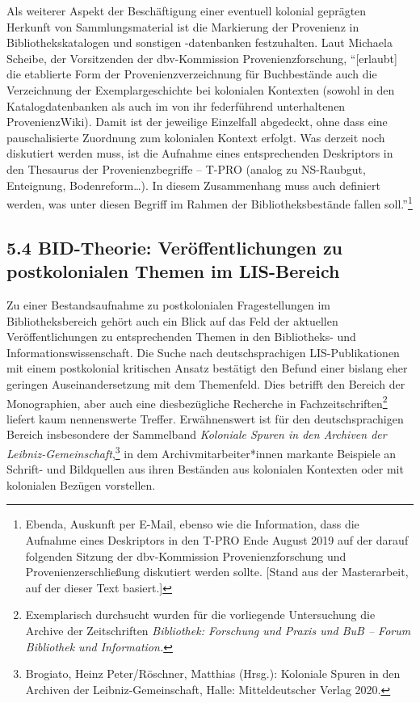 \documentclass[a4paper,
fontsize=11pt,
oneside,
numbers=noperiodatend,
parskip=half-,
bibliography=totoc,
final
]{scrartcl}
\begin{document}
Als weiterer Aspekt der Beschäftigung einer eventuell kolonial geprägten
Herkunft von Sammlungsmaterial ist die Markierung der Provenienz in
Bibliothekskatalogen und sonstigen -daten\-banken festzuhalten. Laut
Michaela Scheibe, der Vorsitzenden der dbv-Kommission
Provenienzforschung, \enquote{{[}erlaubt{]} die etablierte Form der
Provenienzverzeichnung für Buchbestände auch die Verzeichnung der
Exemplargeschichte bei kolonialen Kontexten (sowohl in den
Katalogdatenbanken als auch im von ihr federführend unterhaltenen
ProvenienzWiki). Damit ist der jeweilige Einzelfall abgedeckt, ohne dass
eine pauschalisierte Zuordnung zum kolonialen Kontext erfolgt. Was
derzeit noch diskutiert werden muss, ist die Aufnahme eines
entsprechenden Deskriptors in den Thesaurus der Provenienzbegriffe --
T-PRO (analog zu NS-Raubgut, Enteignung, Bodenreform\ldots). In diesem
Zusammenhang muss auch definiert werden, was unter diesen Begriff im
Rahmen der Bibliotheksbestände fallen soll.}\footnote{Ebenda, Auskunft
  per E-Mail, ebenso wie die Information, dass die Aufnahme eines
  Deskriptors in den T-PRO Ende August 2019 auf der darauf folgenden
  Sitzung der dbv-Kommission Provenienzforschung und
  Provenienzerschließung diskutiert werden sollte. {[}Stand aus der
  Masterarbeit, auf der dieser Text basiert.{]}}

\hypertarget{bid-theorie-veruxf6ffentlichungen-zu-postkolonialen-themen-im-lis-bereich}{%
\subsection{5.4 BID-Theorie: Veröffentlichungen zu postkolonialen Themen
im
LIS-Bereich}\label{bid-theorie-veruxf6ffentlichungen-zu-postkolonialen-themen-im-lis-bereich}}

Zu einer Bestandsaufnahme zu postkolonialen Fragestellungen im
Bibliotheksbereich gehört auch ein Blick auf das Feld der aktuellen
Veröffentlichungen zu entsprechenden Themen in den Bibliotheks- und
Informationswissenschaft. Die Suche nach deutschsprachigen
LIS-Publikati\-onen mit einem postkolonial kritischen Ansatz bestätigt den
Befund einer bislang eher geringen Auseinandersetzung mit dem
Themenfeld. Dies betrifft den Bereich der Monographien, aber auch eine
diesbezügliche Recherche in Fachzeitschriften\footnote{Exemplarisch
  durchsucht wurden für die vorliegende Untersuchung die Archive der
  Zeitschriften \emph{Bibliothek: Forschung und Praxis und BuB -- Forum
  Bibliothek und Information.}} liefert kaum nennenswerte Treffer.
Erwähnenswert ist für den deutschsprachigen Bereich insbesondere der
Sammelband \emph{Koloniale Spuren in den Archiven der
Leibniz-Gemeinschaft},\footnote{Brogiato, Heinz Peter/Röschner, Matthias
  (Hrsg.): Koloniale Spuren in den Archiven der Leibniz-Gemeinschaft,
  Halle: Mitteldeutscher Verlag 2020.} in dem Archivmitarbeiter*innen
markante Beispiele an Schrift- und Bildquellen aus ihren Beständen aus
kolonialen Kontexten oder mit kolonialen Bezügen vorstellen.
\end{document}

